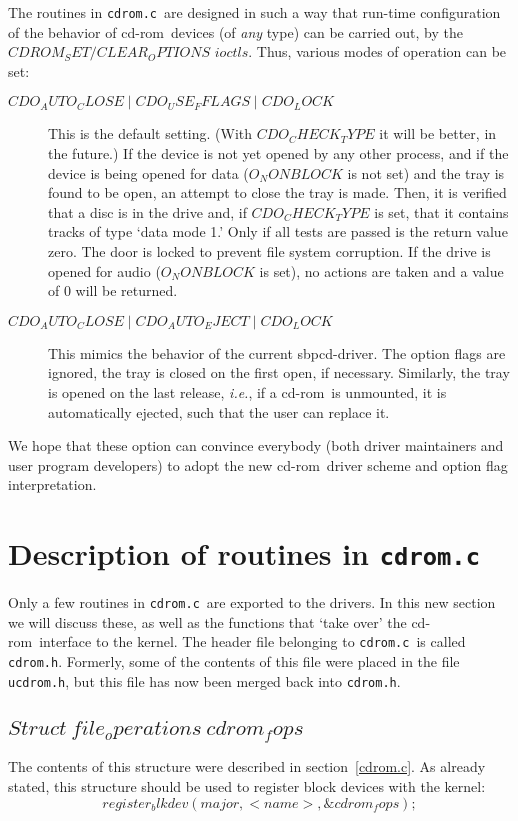 \documentclass{article}
\newcommand{\newsection}[1]{\newpage\section{#1}}
\def\cdrom{{\sc cd-rom}}
\def\cdromc{{\tt {cdrom.c}}}
\def\cdromh{{\tt {cdrom.h}}}
\def\fo{\sl}                    %
\def\ie{{\fo i.e.}}
\begin{document}
The routines in \cdromc\ are designed in such a way that run-time
configuration of the behavior of \cdrom\ devices (of {\em any\/} type)
can be carried out, by the $CDROM_SET/CLEAR_OPTIONS$ $ioctls$. Thus, various
modes of operation can be set:
\begin{description}
\item[$CDO_AUTO_CLOSE \mathrel| CDO_USE_FFLAGS \mathrel| CDO_LOCK$] This
is the default setting. (With $CDO_CHECK_TYPE$ it will be better, in the
future.) If the device is not yet opened by any other process, and if
the device is being opened for data ($O_NONBLOCK$ is not set) and the
tray is found to be open, an attempt to close the tray is made. Then,
it is verified that a disc is in the drive and, if $CDO_CHECK_TYPE$ is
set, that it contains tracks of type `data mode 1.' Only if all tests
are passed is the return value zero. The door is locked to prevent file
system corruption. If the drive is opened for audio ($O_NONBLOCK$ is
set), no actions are taken and a value of 0 will be returned. 
\item[$CDO_AUTO_CLOSE \mathrel| CDO_AUTO_EJECT \mathrel| CDO_LOCK$] This
mimics the behavior of the current sbpcd-driver. The option flags are
ignored, the tray is closed on the first open, if necessary. Similarly,
the tray is opened on the last release, \ie, if a \cdrom\ is unmounted,
it is automatically ejected, such that the user can replace it.
\end{description} 
We hope that these option can convince everybody (both driver
maintainers and user program developers) to adopt the new \cdrom\
driver scheme and option flag interpretation.

\newsection{Description of routines in \cdromc}

Only a few routines in \cdromc\ are exported to the drivers. In this
new section we will discuss these, as well as the functions that `take
over' the \cdrom\ interface to the kernel. The header file belonging
to \cdromc\ is called \cdromh. Formerly, some of the contents of this
file were placed in the file {\tt {ucdrom.h}}, but this file has now been
merged back into \cdromh.

\subsection{$Struct\ file_operations\ cdrom_fops$}

The contents of this structure were described in section~\ref{cdrom.c}.
As already stated, this structure should be used to register block
devices with the kernel:
$$
register_blkdev(major, <name>, \&cdrom_fops);
$$
\end{document}
